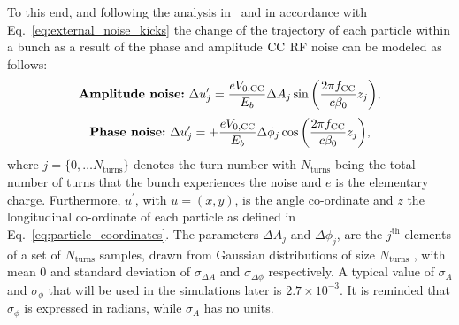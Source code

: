 To this end, and following the analysis in~\cite{PhysRevSTAB.18.101001} and in accordance with Eq.~\eqref{eq:external_noise_kicks} the change of the trajectory of each particle within a bunch as a result of the phase and amplitude ${\mathrm{CC}}$ RF noise can be modeled as follows:
\begin{equation}\label{eq:amplitude_noise_kick}
    \textbf{\textrm{Amplitude noise:}} \ \Delta u^\prime_{j} =  \frac{e {V_\mathrm{0, CC}}}{E_b} \Delta A_j \sin{\left (  \frac{2 \pi {f_\mathrm{CC}}}{c \beta_0}z_j   \right )},
  \end{equation}
  \begin{equation}\label{eq:phase_noise_kick}
      \textbf{\textrm{Phase noise:}} \ \Delta u^\prime_{j} = +  \frac{e {V_\mathrm{0, CC}}}{E_b} \Delta \phi_j  \cos{\left (  \frac{2 \pi {f_\mathrm{CC}}}{c \beta_0}z_j   \right )},
  \end{equation}
where $j=\{ 0,\dots N_\mathrm{turns} \}$ denotes the turn number with $N_\mathrm{turns}$ being the total number of turns that the bunch experiences the noise and $e$ is the elementary charge. Furthermore, $u^\prime$, with $u=(x,y)$, is the angle co-ordinate and $z$ the longitudinal co-ordinate of each particle as defined in Eq.~\eqref{eq:particle_coordinates}. The parameters $\Delta A_j$ and $\Delta \phi_j$, are the $j^\textrm{th}$ elements of a set of $N_\mathrm{turns}$ samples, drawn from Gaussian distributions of size $N_\mathrm{turns}$ , with mean 0 and standard deviation of $\sigma_{\Delta A}$ and $\sigma_{\Delta \phi}$ respectively. A typical value of $\sigma_A$ and $\sigma_\phi$ that will be used in the simulations later is $2.7 \times 10^{-3}$.  It is reminded that $\sigma_\phi$ is expressed in radians, while $\sigma_A$ has no units.

